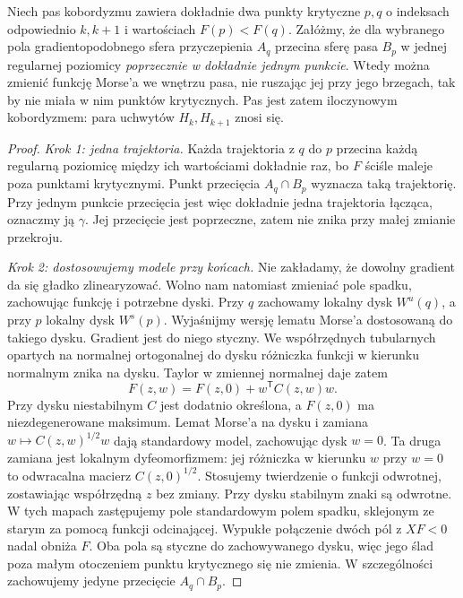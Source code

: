 \begin{twierdzenie}
\label{thm:zniesienie-18}
Niech pas kobordyzmu zawiera dokładnie
dwa punkty krytyczne $p,q$ o indeksach
odpowiednio $k,k+1$ i wartościach
$F(p)<F(q)$. Załóżmy, że dla wybranego
pola gradientopodobnego sfera przyczepienia
$A_q$ przecina sferę pasa $B_p$ w jednej
regularnej poziomicy \emph{poprzecznie
w dokładnie jednym punkcie}.
Wtedy można zmienić funkcję Morse'a
we wnętrzu pasa, nie ruszając jej przy
jego brzegach, tak by nie miała w nim
punktów krytycznych. Pas jest zatem
iloczynowym kobordyzmem: para uchwytów
$H_k,H_{k+1}$ znosi się.
\end{twierdzenie}
\begin{proof}
\emph{Krok 1: jedna trajektoria.}
Każda trajektoria z $q$ do $p$ przecina
każdą regularną poziomicę między ich
wartościami dokładnie raz, bo $F$
ściśle maleje poza punktami krytycznymi.
Punkt przecięcia $A_q\cap B_p$ wyznacza
taką trajektorię. Przy jednym punkcie
przecięcia jest więc dokładnie jedna
trajektoria łącząca, oznaczmy ją $\gamma$.
Jej przecięcie jest poprzeczne, zatem
nie znika przy małej zmianie przekroju.

\emph{Krok 2: dostosowujemy modele przy końcach.}
Nie zakładamy, że dowolny gradient da się gładko
zlinearyzować. Wolno nam natomiast zmieniać pole
spadku, zachowując funkcję i potrzebne dyski.
Przy $q$ zachowamy lokalny dysk $W^u(q)$,
a przy $p$ lokalny dysk $W^s(p)$.
Wyjaśnijmy wersję lematu Morse'a dostosowaną do takiego dysku.
Gradient jest do niego styczny. We współrzędnych
tubularnych opartych na normalnej ortogonalnej do dysku
różniczka funkcji w kierunku normalnym znika na dysku.
Taylor w zmiennej normalnej daje zatem
\[
 F(z,w)=F(z,0)+w^{\mathsf T}C(z,w)w.
\]
Przy dysku niestabilnym $C$ jest dodatnio określona,
a $F(z,0)$ ma niezdegenerowane maksimum.
Lemat Morse'a na dysku i zamiana $w\mapsto C(z,w)^{1/2}w$
dają standardowy model, zachowując dysk $w=0$.
Ta druga zamiana jest lokalnym dyfeomorfizmem:
jej różniczka w kierunku $w$ przy $w=0$ to odwracalna
macierz $C(z,0)^{1/2}$. Stosujemy twierdzenie o funkcji odwrotnej,
zostawiając współrzędną $z$ bez zmiany.
Przy dysku stabilnym znaki są odwrotne.
W tych mapach zastępujemy pole standardowym polem
spadku, sklejonym ze starym za pomocą funkcji odcinającej.
Wypukłe połączenie dwóch pól z $XF<0$ nadal obniża $F$.
Oba pola są styczne do zachowywanego dysku, więc jego
ślad poza małym otoczeniem punktu krytycznego się nie zmienia.
W szczególności zachowujemy jedyne przecięcie $A_q\cap B_p$.


\end{proof}
